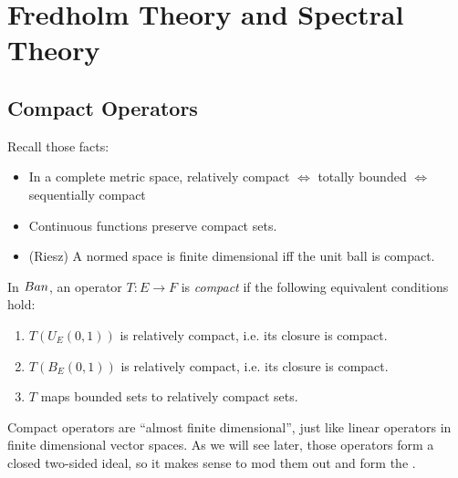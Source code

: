 
\section{Fredholm Theory and Spectral Theory}


\subsection{Compact Operators}



Recall those facts:
\begin{itemize}
	\item In a complete metric space, relatively compact $\iff $ totally bounded $\iff $ sequentially compact
	\item Continuous functions preserve compact sets.
	\item (Riesz) A normed space is finite dimensional iff the unit ball is compact.
\end{itemize}

\begin{definition}
	\label{defn:CompactOperator} 
	In $\normalfont{Ban} $,
	an operator $T: E \to F$ is \textit{compact} if the following equivalent conditions hold:
	\begin{enumerate}
		\item  $T(U_{E}(0,1))$ is relatively compact, i.e. its closure is compact.
		\item  $T(B_{E}(0,1))$ is relatively compact, i.e. its closure is compact.
		\item $T$ maps bounded sets to relatively compact sets.
	\end{enumerate}
\end{definition}

\begin{intuition}
	Compact operators are ``almost finite dimensional'', just like linear operators in finite dimensional vector spaces. As we will see later, those operators form a closed two-sided ideal, so it makes sense to mod them out and form the .
\end{intuition}

